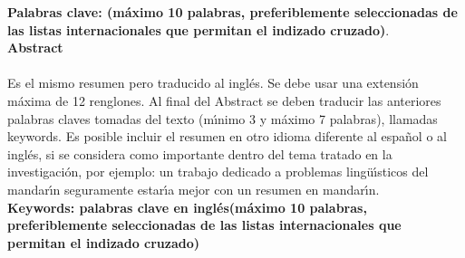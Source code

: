 \textbf{\small Palabras clave: (m\'{a}ximo 10 palabras, preferiblemente seleccionadas de las listas internacionales que permitan el indizado cruzado)}.\\

\textbf{\LARGE Abstract}\\\\
Es el mismo resumen pero traducido al ingl\'{e}s. Se debe usar una extensi\'{o}n m\'{a}xima de 12 renglones. Al final del Abstract se deben traducir las anteriores palabras claves tomadas del texto (m\'{\i}nimo 3 y m\'{a}ximo 7 palabras), llamadas keywords. Es posible incluir el resumen en otro idioma diferente al espa\~{n}ol o al ingl\'{e}s, si se considera como importante dentro del tema tratado en la investigaci\'{o}n, por ejemplo: un trabajo dedicado a problemas ling\"{u}\'{\i}sticos del mandar\'{\i}n seguramente estar\'{\i}a mejor con un resumen en mandar\'{\i}n.\\

\textbf{\small Keywords: palabras clave en ingl\'{e}s(m\'{a}ximo 10 palabras, preferiblemente seleccionadas de las listas internacionales que permitan el indizado cruzado)}\\
